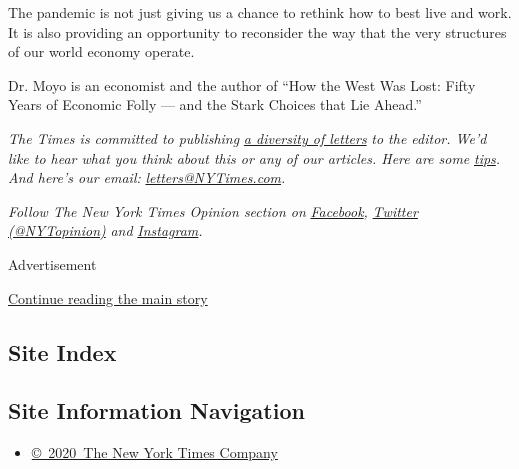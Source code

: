 The pandemic is not just giving us a chance to rethink how to best live
and work. It is also providing an opportunity to reconsider the way that
the very structures of our world economy operate.

Dr. Moyo is an economist and the author of ``How the West Was Lost:
Fifty Years of Economic Folly --- and the Stark Choices that Lie
Ahead.''

\emph{The Times is committed to publishing}
\href{https://www.nytimes3xbfgragh.onion/2019/01/31/opinion/letters/letters-to-editor-new-york-times-women.html}{\emph{a
diversity of letters}} \emph{to the editor. We'd like to hear what you
think about this or any of our articles. Here are some}
\href{https://help.nytimes3xbfgragh.onion/hc/en-us/articles/115014925288-How-to-submit-a-letter-to-the-editor}{\emph{tips}}\emph{.
And here's our email:}
\href{mailto:letters@NYTimes.com}{\emph{letters@NYTimes.com}}\emph{.}

\emph{Follow The New York Times Opinion section on}
\href{https://www.facebookcorewwwi.onion/nytopinion}{\emph{Facebook}}\emph{,}
\href{http://twitter.com/NYTOpinion}{\emph{Twitter (@NYTopinion)}}
\emph{and}
\href{https://www.instagram.com/nytopinion/}{\emph{Instagram}}\emph{.}

Advertisement

\protect\hyperlink{after-bottom}{Continue reading the main story}

\hypertarget{site-index}{%
\subsection{Site Index}\label{site-index}}

\hypertarget{site-information-navigation}{%
\subsection{Site Information
Navigation}\label{site-information-navigation}}

\begin{itemize}
\tightlist
\item
  \href{https://help.nytimes3xbfgragh.onion/hc/en-us/articles/115014792127-Copyright-notice}{©~2020~The
  New York Times Company}
\end{itemize}


